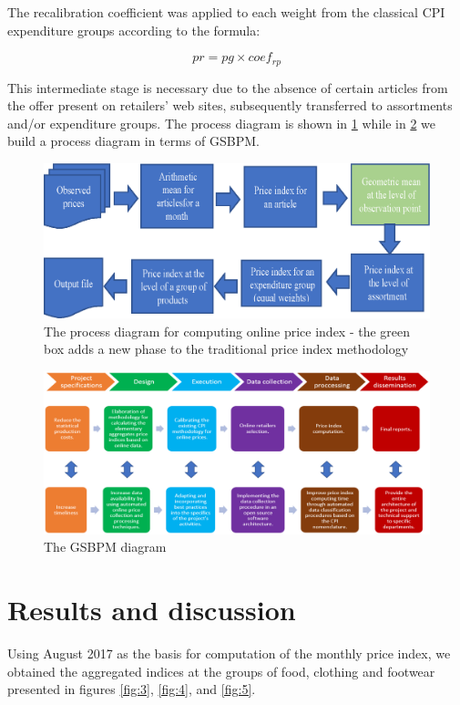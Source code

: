 \documentclass[]{article}
\begin{document}
The recalibration coefficient was applied to each weight from the classical CPI expenditure groups according to the formula:


\begin{equation}\label{eq:3}
pr = pg \times coef_{rp}
\end{equation}


This intermediate stage is necessary due to the absence of certain articles from the offer present on retailers' web sites, subsequently transferred to assortments and/or expenditure groups.
The process diagram is shown in \ref{fig:1} while in \ref{fig:2} we build a process diagram in terms of GSBPM.


\begin{figure}
	\centering
	\includegraphics[width=0.7\linewidth]{fig1.eps}
	\caption{The process diagram for computing online price index - the green box adds a new phase to the traditional price index methodology}
	\label{fig:1}
\end{figure}


\begin{figure}
	\centering
	\includegraphics[width=0.7\linewidth]{fig2.eps}
	\caption{The GSBPM diagram}
	\label{fig:2}
\end{figure}



\section{Results and discussion }

Using August 2017 as the basis for computation of the monthly price index, we obtained the aggregated indices at the 
groups of food, clothing and footwear presented in figures \ref{fig:3}, \ref{fig:4}, and \ref{fig:5}.
\end{document}
